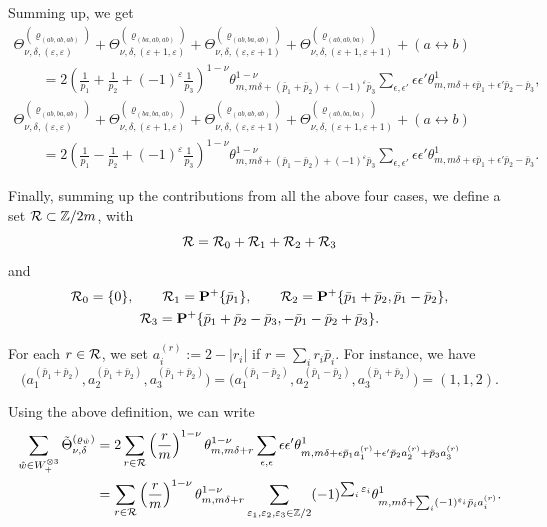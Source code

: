 \documentclass[10pt,a4paper]{amsart}
\newcommand{\ZZ}{\mathbb{Z}}
\def\bos{\varrho}
\theoremstyle{definition}
\numberwithin{equation}{section}
\begin{document}
Summing up, we get
\begin{gather*}
\Theta_{\nu,\delta,(\varepsilon,\varepsilon)}^{(\bos_{(ab,ab,ab)})} + \Theta_{\nu,\delta,(\varepsilon+1,\varepsilon)}^{(\bos_{(ba,ab,ab)})}+ \Theta_{\nu,\delta,(\varepsilon,\varepsilon+1)}^{(\bos_{(ab,ba,ab)})} +\Theta_{\nu,\delta,(\varepsilon+1,\varepsilon+1)}^{(\bos_{(ab,ab,ba)})} + (a\leftrightarrow b) \\
\qquad= 2\left(\frac{1}{p_1}+\frac{1}{p_2} +(-1)^{\varepsilon}\frac{1}{p_3}\right)^{1-\nu} \theta^{1-\nu}_{m,m\delta+(\bar p_1+\bar p_2)+(-1)^{\varepsilon}\bar p_3} \sum_{\epsilon, \epsilon'} \epsilon\epsilon' \theta^1_{m,m\delta+\epsilon \bar p_1+\epsilon '\bar p_2 -\bar p_3},\\
\Theta_{\nu,\delta,(\varepsilon,\varepsilon)}^{(\bos_{(ab,ba,ab)})} + \Theta_{\nu,\delta,(\varepsilon+1,\varepsilon)}^{(\bos_{(ba,ba,ab)})}+ \Theta_{\nu,\delta,(\varepsilon,\varepsilon+1)}^{(\bos_{(ab,ab,ab)})} +\Theta_{\nu,\delta,(\varepsilon+1,\varepsilon+1)}^{(\bos_{(ab,ba,ba)})} + (a\leftrightarrow b) \\
\qquad= 2
 \left(\frac{1}{p_1}-\frac{1}{p_2} +(-1)^{\varepsilon}\frac{1}{p_3}\right)^{1-\nu}
 \theta^{1-\nu}_{m,m\delta+(\bar p_1-\bar p_2)+(-1)^{\varepsilon}\bar p_3} \sum_{\epsilon, \epsilon'} \epsilon\epsilon' \theta^1_{m,m\delta+\epsilon \bar p_1+\epsilon' \bar p_2 -\bar p_3} .
\end{gather*}

Finally, summing up the contributions from all the above four cases, we define a set ${\cal R} \subset \ZZ/2m$, with
\[
{\cal R} = {\cal R}_0+{\cal R}_1+{\cal R}_2+{\cal R}_3
\]
and
\begin{gather*}
 {\cal R}_0 = \{0\},\qquad
 {\cal R}_1 = {\bf P}^+ \{\bar p_1\}, \qquad
 {\cal R}_2 = {\bf P}^+ \{\bar p_1+\bar p_2, \bar p_1-\bar p_2\},\\
 {\cal R}_3 = {\bf P}^+ \{\bar p_1+\bar p_2-\bar p_3, -\bar p_1-\bar p_2+\bar p_3\}.
\end{gather*}

For each $r\in {\cal R}$, we set $a_i^{(r)}:= 2-|r_i|$ if $r=\sum_i r_i \bar p_i$. For instance, we have \[\bigl(a_1^{(\bar p_1+\bar p_2)}, a_2^{(\bar p_1+\bar p_2)},a_3^{(\bar p_1+\bar p_2)}\bigr) =\bigl(a_1^{(\bar p_1-\bar p_2)}, a_2^{(\bar p_1-\bar p_2)},a_3^{(\bar p_1+\bar p_2)}\bigr) = (1,1,2).\]

Using the above definition, we can write
\begin{align*}
 \sum\limits_{\hat{w}\in W_+^{\otimes 3}} {\tilde \Theta_{\nu,\delta}}^{(\bos_{\hat{w}})} &= 2\sum_{r\in {\cal R}} \left(\frac{r}{m}\right)^{1-\nu} \theta^{1-\nu}_{m,m\delta+r} \sum_{\epsilon, \epsilon} \epsilon\epsilon' \theta^1_{m,m\delta+\epsilon \bar p_1 a_1^{(r)}
 +\epsilon' \bar p_2 a_2^{(r)} + \bar p_3 a_3^{(r)}} \\
 &=\sum_{r\in {\cal R}} \left(\frac{r}{m}\right)^{1-\nu} \theta^{1-\nu}_{m,m\delta+r} \sum_{\varepsilon_1,\varepsilon_2,\varepsilon_3\in \ZZ/2} (-1)^{\sum_i \varepsilon_i} \theta^1_{m,m\delta+\sum_i (-1)^{ \varepsilon_i}\bar p_i a_i^{(r)}
 } .
\end{align*}
\end{document}
